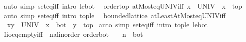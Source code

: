 \begin{isabellebody}
%
\isadelimproof
%
\endisadelimproof
%
\isatagproof
{}\isamarkupfalse%
\ {\isacharparenleft}{\kern0pt}auto\ simp{\isacharcolon}{\kern0pt}\ set{\isacharunderscore}{\kern0pt}eq{\isacharunderscore}{\kern0pt}iff\ intro{\isacharcolon}{\kern0pt}\ le{\isacharunderscore}{\kern0pt}bot{\isacharparenright}{\kern0pt}%
\endisatagproof
{\isafoldproof}%
%
\isadelimproof
\isanewline
%
\endisadelimproof
\isanewline
{}\isamarkupfalse%
\ {\isacharparenleft}{\kern0pt}\ order{\isacharunderscore}{\kern0pt}top{\isacharparenright}{\kern0pt}\ atMost{\isacharunderscore}{\kern0pt}eq{\isacharunderscore}{\kern0pt}UNIV{\isacharunderscore}{\kern0pt}iff{\isacharcolon}{\kern0pt}\ {\isachardoublequoteopen}{\isacharbraceleft}{\kern0pt}{\isachardot}{\kern0pt}{\isachardot}{\kern0pt}x{\isacharbraceright}{\kern0pt}\ {\isacharequal}{\kern0pt}\ UNIV\ {\isasymlongleftrightarrow}\ x\ {\isacharequal}{\kern0pt}\ top{\isachardoublequoteclose}\isanewline
%
\isadelimproof
%
\endisadelimproof
%
\isatagproof
{}\isamarkupfalse%
\ {\isacharparenleft}{\kern0pt}auto\ simp{\isacharcolon}{\kern0pt}\ set{\isacharunderscore}{\kern0pt}eq{\isacharunderscore}{\kern0pt}iff\ intro{\isacharcolon}{\kern0pt}\ top{\isacharunderscore}{\kern0pt}le{\isacharparenright}{\kern0pt}%
\endisatagproof
{\isafoldproof}%
%
\isadelimproof
\isanewline
%
\endisadelimproof
\isanewline
{}\isamarkupfalse%
\ {\isacharparenleft}{\kern0pt}\ bounded{\isacharunderscore}{\kern0pt}lattice{\isacharparenright}{\kern0pt}\ atLeastAtMost{\isacharunderscore}{\kern0pt}eq{\isacharunderscore}{\kern0pt}UNIV{\isacharunderscore}{\kern0pt}iff{\isacharcolon}{\kern0pt}\isanewline
\ \ {\isachardoublequoteopen}{\isacharbraceleft}{\kern0pt}x{\isachardot}{\kern0pt}{\isachardot}{\kern0pt}y{\isacharbraceright}{\kern0pt}\ {\isacharequal}{\kern0pt}\ UNIV\ {\isasymlongleftrightarrow}\ {\isacharparenleft}{\kern0pt}x\ {\isacharequal}{\kern0pt}\ bot\ {\isasymand}\ y\ {\isacharequal}{\kern0pt}\ top{\isacharparenright}{\kern0pt}{\isachardoublequoteclose}\isanewline
%
\isadelimproof
%
\endisadelimproof
%
\isatagproof
{}\isamarkupfalse%
\ {\isacharparenleft}{\kern0pt}auto\ simp{\isacharcolon}{\kern0pt}\ set{\isacharunderscore}{\kern0pt}eq{\isacharunderscore}{\kern0pt}iff\ intro{\isacharcolon}{\kern0pt}\ top{\isacharunderscore}{\kern0pt}le\ le{\isacharunderscore}{\kern0pt}bot{\isacharparenright}{\kern0pt}%
\endisatagproof
{\isafoldproof}%
%
\isadelimproof
\isanewline
%
\endisadelimproof
\isanewline
{}\isamarkupfalse%
\ Iio{\isacharunderscore}{\kern0pt}eq{\isacharunderscore}{\kern0pt}empty{\isacharunderscore}{\kern0pt}iff{\isacharcolon}{\kern0pt}\ {\isachardoublequoteopen}{\isacharbraceleft}{\kern0pt}{\isachardot}{\kern0pt}{\isachardot}{\kern0pt}{\isacharless}{\kern0pt}\ n{\isacharcolon}{\kern0pt}{\isacharcolon}{\kern0pt}{\isacharprime}{\kern0pt}a{\isacharcolon}{\kern0pt}{\isacharcolon}{\kern0pt}{\isacharbraceleft}{\kern0pt}linorder{\isacharcomma}{\kern0pt}\ order{\isacharunderscore}{\kern0pt}bot{\isacharbraceright}{\kern0pt}{\isacharbraceright}{\kern0pt}\ {\isacharequal}{\kern0pt}\ {\isacharbraceleft}{\kern0pt}{\isacharbraceright}{\kern0pt}\ {\isasymlongleftrightarrow}\ n\ {\isacharequal}{\kern0pt}\ bot{\isachardoublequoteclose}\isanewline

\end{isabellebody}
